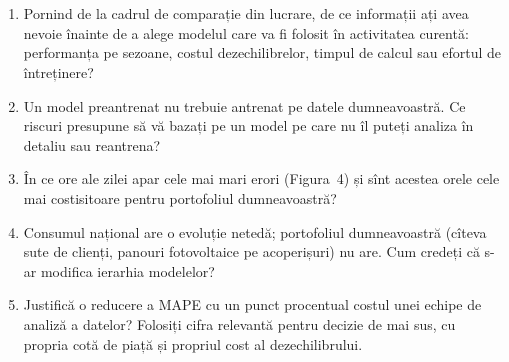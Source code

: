 \section{}
\begin{enumerate}
\item {}%
{Pornind de la cadrul de comparație din lucrare, de ce informații ați avea nevoie înainte de a alege modelul care va fi folosit în activitatea curentă: performanța pe sezoane, costul dezechilibrelor, timpul de calcul sau efortul de întreținere?}
\item {}%
{Un model preantrenat nu trebuie antrenat pe datele dumneavoastră. Ce riscuri presupune să vă bazați pe un model pe care nu îl puteți analiza în detaliu sau reantrena?}
\item {}%
{În ce ore ale zilei apar cele mai mari erori (Figura~4) și sînt acestea orele cele mai costisitoare pentru portofoliul dumneavoastră?}
\item {}%
{Consumul național are o evoluție netedă; portofoliul dumneavoastră (cîteva sute de clienți, panouri fotovoltaice pe acoperișuri) nu are. Cum credeți că s-ar modifica ierarhia modelelor?}
\item {}%
{Justifică o reducere a MAPE cu un punct procentual costul unei echipe de analiză a datelor? Folosiți cifra relevantă pentru decizie de mai sus, cu propria cotă de piață și propriul cost al dezechilibrului.}
\end{enumerate}

